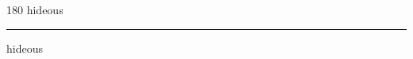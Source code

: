 
\begin{frame}
\begin{center}
\begin{turn}{180}
{\fontsize{2.5cm}{1em}\selectfont hideous}
\end{turn}
\vspace{1em}\par  
\hrule
\vspace{1em}\par  
{\fontsize{2.5cm}{1em}\selectfont hideous}
\end{center}
\end{frame}
